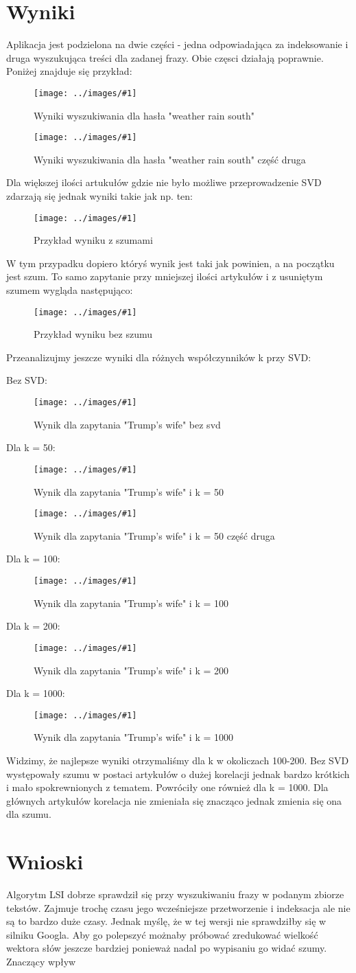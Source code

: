 \documentclass{article}
\newcommand{\image}[2]{\begin{figure}[H]
	\centering	
	\texttt{[image: ../images/\#1]}
	\caption{#2}
\end{figure}}
\begin{document}
\section{Wyniki}

Aplikacja jest podzielona na dwie części - jedna odpowiadająca za indeksowanie i druga wyszukująca treści dla zadanej frazy. Obie częsci działają poprawnie. Poniżej znajduje się przykład:

\image{weather_rain_south.png}{Wyniki wyszukiwania dla hasła "weather rain south"}

\image{weather_rain_south_2.png}{Wyniki wyszukiwania dla hasła "weather rain south" część druga}

Dla większej ilości artukułów gdzie nie było możliwe przeprowadzenie SVD zdarzają się jednak wyniki takie jak np. ten:

\image{baseball_fan_with_noise.png}{Przykład wyniku z szumami}

W tym przypadku dopiero któryś wynik jest taki jak powinien, a na początku jest szum. To samo zapytanie przy mniejszej ilości artykułów i z usuniętym szumem wygląda następująco:

\image{baseball_fan_without_noise.png}{Przykład wyniku bez szumu}

Przeanalizujmy jeszcze wyniki dla różnych współczynników k przy SVD:

Bez SVD:
\image{trumps_wife_no_svd.png}{Wynik dla zapytania "Trump's wife" bez svd}

Dla k = 50:
\image{trumps_wife_50.png}{Wynik dla zapytania "Trump's wife" i k = 50}
\image{trumps_wife_50_2.png}{Wynik dla zapytania "Trump's wife" i k = 50 część druga}

Dla k = 100:
\image{trumps_wife_100.png}{Wynik dla zapytania "Trump's wife" i k = 100}

Dla k = 200:
\image{trumps_wife_200.png}{Wynik dla zapytania "Trump's wife" i k = 200}

Dla k = 1000:
\image{trumps_wife_1000.png}{Wynik dla zapytania "Trump's wife" i k = 1000}

Widzimy, że najlepsze wyniki otrzymaliśmy dla k w okoliczach 100-200. Bez SVD występowały szumu w postaci artykułów o dużej korelacji jednak bardzo krótkich i mało spokrewnionych z tematem. Powróciły one również dla k = 1000. Dla głównych artykułów korelacja nie zmieniała się znacząco jednak zmienia się ona dla szumu.

\section{Wnioski}
Algorytm LSI dobrze sprawdził się przy wyszukiwaniu frazy w podanym zbiorze tekstów. Zajmuje trochę czasu jego wcześniejsze przetworzenie i indeksacja ale nie są to bardzo duże czasy. Jednak myślę, że w tej wersji nie sprawdziłby się w silniku Googla. 
Aby go polepszyć możnaby próbować zredukować wielkość wektora słów jeszcze bardziej ponieważ nadal po wypisaniu go widać szumy. Znaczący wpływ
\end{document}
